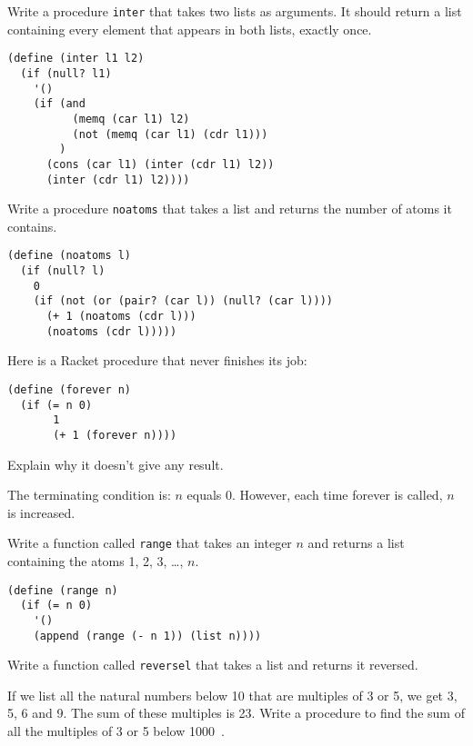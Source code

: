 \documentclass[addpoints,12pt,a4paper]{exam}
\begin{document}
\begin{questions}
\question
Write a procedure \texttt{inter} that takes two lists as arguments.
It should return a list containing every element that appears in both lists, exactly once.

\begin{solution}
  \begin{verbatim}
(define (inter l1 l2)
  (if (null? l1)
    '()
    (if (and 
          (memq (car l1) l2)
          (not (memq (car l1) (cdr l1)))
        )
      (cons (car l1) (inter (cdr l1) l2))
      (inter (cdr l1) l2))))
  \end{verbatim}
\end{solution}

\question
Write a procedure \texttt{noatoms} that takes a list and returns the number of atoms it contains.

\begin{solution}
  \begin{verbatim}
(define (noatoms l)
  (if (null? l)
    0
    (if (not (or (pair? (car l)) (null? (car l))))
      (+ 1 (noatoms (cdr l)))
      (noatoms (cdr l)))))
  \end{verbatim}
\end{solution}

\question
Here is a Racket procedure that never finishes its job:
\begin{verbatim}
(define (forever n)
  (if (= n 0)
       1
       (+ 1 (forever n))))
\end{verbatim}
Explain why it doesn’t give any result\cite{simplyscheme}.

\begin{solution}
The terminating condition is: $n$ equals 0.
However, each time forever is called, $n$ is increased.
\end{solution}

\question
Write a function called \texttt{range} that takes an integer $n$ and returns a list containing the atoms 1, 2, 3, \ldots, $n$.

\begin{solution}
\begin{verbatim}
(define (range n)
  (if (= n 0)
    '()
    (append (range (- n 1)) (list n))))
\end{verbatim}
\end{solution}

\question
Write a function called \texttt{reversel} that takes a list and returns it reversed.  

\question
If we list all the natural numbers below 10 that are multiples of 3 or 5, we get 3, 5, 6 and 9.
The sum of these multiples is 23.
Write a procedure to find the sum of all the multiples of 3 or 5 below 1000~\cite{projecteuler}.


\end{questions}
\end{document}
